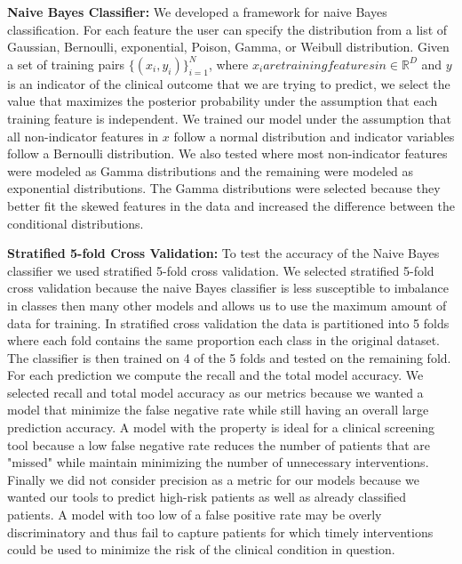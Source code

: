 \documentclass{article}
\begin{document}
\textbf{Naive Bayes Classifier:} We developed a framework for naive Bayes classification. For each feature the user can specify the distribution from a list of Gaussian, Bernoulli, exponential, Poison, Gamma, or Weibull distribution. Given a set of training pairs $\{(x_i, y_i)\}_{i=1}^N$, where $x_i are training features in \in \mathbb{R}^D$ and $y$ is an indicator of the clinical outcome that we are trying to predict, we select the value that maximizes the posterior probability under the assumption that each training feature is independent. We trained our model under the assumption that all non-indicator features in $x$ follow a normal distribution and indicator variables follow a Bernoulli distribution. We also tested where most non-indicator features were modeled as Gamma distributions and the remaining were modeled as exponential distributions. The Gamma distributions were selected because they better fit the skewed features in the data and increased the difference between the conditional distributions. 

\textbf{Stratified 5-fold Cross Validation:} To test the accuracy of the Naive Bayes classifier we used stratified 5-fold cross validation. We selected stratified 5-fold cross validation because the naive Bayes classifier is less susceptible to imbalance in classes then many other models and allows us to use the maximum amount of data for training. In stratified cross validation the data is partitioned into 5 folds where each fold contains the same proportion each class in the original dataset. The classifier is then trained on 4 of the 5 folds and tested on the remaining fold. For each prediction we compute the recall and the total model accuracy.  We selected recall and total model accuracy as our metrics because we wanted a model that minimize the false negative rate while still having an overall large prediction accuracy. A model with the property is ideal for a clinical screening tool because a low false negative rate reduces the number of patients that are "missed" while maintain minimizing the number of unnecessary interventions. Finally we did not consider precision as a metric for our models because we wanted our tools to predict high-risk patients as well as already classified patients. A model with too low of a false positive rate may be overly discriminatory and thus fail to capture patients for which timely interventions could be used to minimize the risk of the clinical condition in question. 
\end{document}
